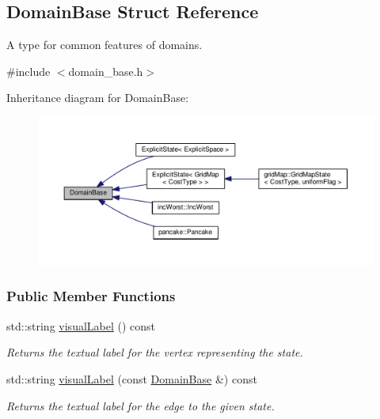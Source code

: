 \hypertarget{structDomainBase}{}\subsection{Domain\+Base Struct Reference}
\label{structDomainBase}


A type for common features of domains.  




{\ttfamily \#include $<$domain\+\_\+base.\+h$>$}



Inheritance diagram for Domain\+Base\+:\nopagebreak
\begin{figure}[H]
\begin{center}
\leavevmode
\includegraphics[width=350pt]{structDomainBase__inherit__graph}
\end{center}
\end{figure}
\subsubsection*{Public Member Functions}
\begin{DoxyCompactItemize}
\item 
std\+::string \hyperlink{structDomainBase_a21a0228f4d79efc2c92f447020a02a29}{visual\+Label} () const 
\begin{DoxyCompactList}\small\item\em Returns the textual label for the vertex representing the state. \end{DoxyCompactList}\item 
std\+::string \hyperlink{structDomainBase_aac0865189e632441cc0f2a70da034eb2}{visual\+Label} (const \hyperlink{structDomainBase}{Domain\+Base} \&) const 
\begin{DoxyCompactList}\small\item\em Returns the textual label for the edge to the given state. \end{DoxyCompactList}\end{DoxyCompactItemize}
